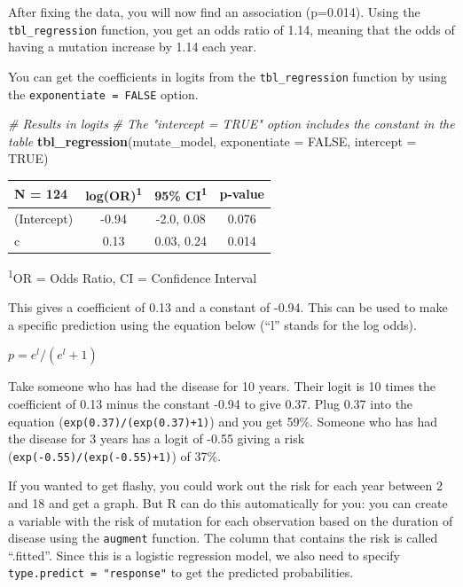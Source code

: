 \documentclass[]{book}
\newenvironment{Shaded}{\begin{snugshade}}{\end{snugshade}}
\newcommand{\CommentTok}[1]{\textcolor[rgb]{0.56,0.35,0.01}{\textit{#1}}}
\newcommand{\DataTypeTok}[1]{\textcolor[rgb]{0.13,0.29,0.53}{#1}}
\newcommand{\KeywordTok}[1]{\textcolor[rgb]{0.13,0.29,0.53}{\textbf{#1}}}
\newcommand{\NormalTok}[1]{#1}
\newcommand{\OtherTok}[1]{\textcolor[rgb]{0.56,0.35,0.01}{#1}}
\begin{document}
After fixing the data, you will now find an association (p=0.014). Using
the \texttt{tbl\_regression} function, you get an odds ratio of 1.14,
meaning that the odds of having a mutation increase by 1.14 each year.

You can get the coefficients in logits from the \texttt{tbl\_regression}
function by using the \texttt{exponentiate\ =\ FALSE} option.

\begin{Shaded}
\begin{Highlighting}[]
\CommentTok{# Results in logits}
\CommentTok{# The "intercept = TRUE" option includes the constant in the table}
\KeywordTok{tbl_regression}\NormalTok{(mutate_model,}
               \DataTypeTok{exponentiate =} \OtherTok{FALSE}\NormalTok{,}
               \DataTypeTok{intercept =} \OtherTok{TRUE}\NormalTok{)}
\end{Highlighting}
\end{Shaded}

\captionsetup[table]{labelformat=empty,skip=1pt}
\begin{longtable}{lccc}
\toprule
\textbf{N = 124} & \textbf{log(OR)}\textsuperscript{1} & \textbf{95\% CI}\textsuperscript{1} & \textbf{p-value} \\ 
\midrule
(Intercept) & -0.94 & -2.0, 0.08 & 0.076 \\ 
c & 0.13 & 0.03, 0.24 & 0.014 \\ 
\bottomrule
\end{longtable}
\vspace{-5mm}
\begin{minipage}{\linewidth}
\textsuperscript{1}OR = Odds Ratio, CI = Confidence Interval \\ 
\end{minipage}

This gives a coefficient of 0.13 and a constant of -0.94. This can be
used to make a specific prediction using the equation below (``l''
stands for the log odds).

\(p = e^l / (e^l+1)\)

Take someone who has had the disease for 10 years. Their logit is 10
times the coefficient of 0.13 minus the constant -0.94 to give 0.37.
Plug 0.37 into the equation (\texttt{exp(0.37)/(exp(0.37)+1)}) and you
get 59\%. Someone who has had the disease for 3 years has a logit of
-0.55 giving a risk (\texttt{exp(-0.55)/(exp(-0.55)+1)}) of 37\%.

If you wanted to get flashy, you could work out the risk for each year
between 2 and 18 and get a graph. But R can do this automatically for
you: you can create a variable with the risk of mutation for each
observation based on the duration of disease using the \texttt{augment}
function. The column that contains the risk is called ``.fitted''. Since
this is a logistic regression model, we also need to specify
\texttt{type.predict\ =\ "response"} to get the predicted probabilities.
\end{document}
